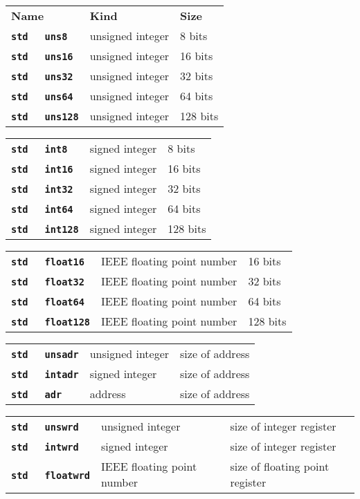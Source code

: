 \documentclass[12pt]{article}
\makeatletter
\newcommand{\TT}[1]{{\tt \bfseries #1}}
\newcommand{\ttkey}[1]{\TT{#1}\index{#1@{\tt #1}}}
\newenvironment{indpar}[1][0.3in]%
	{\begin{list}{}%
		     {\setlength{\itemsep}{0in}%
		      \setlength{\topsep}{0in}%
		      \setlength{\parsep}{1ex}%
		      \setlength{\labelwidth}{#1}%
		      \setlength{\leftmargin}{#1}%
		      \addtolength{\leftmargin}{\labelsep}}%
	 \item}%
	{\end{list}}
\makeatother
\begin{document}
\begin{indpar}
\begin{tabular}{p{1.5in}@{~~~~~~}p{2in}@{~~~~~~}l}
\bf Name & \bf Kind & \bf Size \\[2ex]
\TT{std}~~~\ttkey{uns8}		& unsigned integer & 8 bits \\
\TT{std}~~~\ttkey{uns16}	& unsigned integer & 16 bits \\
\TT{std}~~~\ttkey{uns32}	& unsigned integer & 32 bits \\
\TT{std}~~~\ttkey{uns64}	& unsigned integer & 64 bits \\
\TT{std}~~~\ttkey{uns128}	& unsigned integer & 128 bits
\end{tabular}

\begin{tabular}{p{1.5in}@{~~~~~~}p{2in}@{~~~~~~}l}
\TT{std}~~~\ttkey{int8}		& signed integer & 8 bits \\
\TT{std}~~~\ttkey{int16}	& signed integer & 16 bits \\
\TT{std}~~~\ttkey{int32}	& signed integer & 32 bits \\
\TT{std}~~~\ttkey{int64}	& signed integer & 64 bits \\
\TT{std}~~~\ttkey{int128}	& signed integer & 128 bits
\end{tabular}

\begin{tabular}{p{1.5in}@{~~~~~~}p{2in}@{~~~~~~}l}
\TT{std}~~~\ttkey{float16}	& IEEE floating point number & 16 bits \\
\TT{std}~~~\ttkey{float32}	& IEEE floating point number & 32 bits \\
\TT{std}~~~\ttkey{float64}	& IEEE floating point number & 64 bits \\
\TT{std}~~~\ttkey{float128}	& IEEE floating point number & 128 bits
\end{tabular}

\begin{tabular}{p{1.5in}@{~~~~~~}p{2in}@{~~~~~~}l}
\TT{std}~~~\ttkey{unsadr}	& unsigned integer & size of address \\
\TT{std}~~~\ttkey{intadr}	& signed integer & size of address \\
\TT{std}~~~\ttkey{adr}		& address
                                & size of address \\
\end{tabular}

\begin{tabular}{p{1.5in}@{~~~~~~}p{2in}@{~~~~~~}l}
\TT{std}~~~\ttkey{unswrd}	& unsigned integer & size of integer register \\
\TT{std}~~~\ttkey{intwrd}	& signed integer & size of integer register \\
\TT{std}~~~\ttkey{floatwrd}	& IEEE floating point number
                                & size of floating point register
\end{tabular}


\end{indpar}
\end{document}
